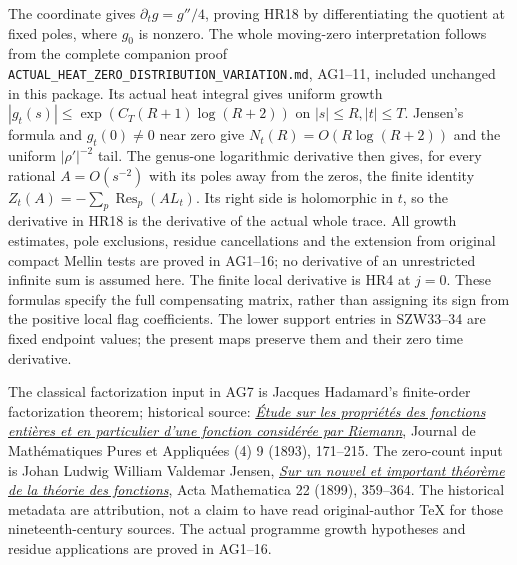 \documentclass[11pt,a4paper]{article}
\theoremstyle{definition}\newtheorem{definition}[theorem]{Definition}
\begin{document}
The coordinate gives $\partial_tg=g''/4$, proving HR18 by
differentiating the quotient at fixed poles, where $g_0$ is
nonzero. The whole moving-zero interpretation follows from the
complete companion proof \texttt{ACTUAL\_HEAT\_ZERO\_DISTRIBUTION\_VARIATION.md},
AG1--11, included unchanged in this package. Its actual heat integral
gives uniform growth $|g_t(s)|\le\exp(C_T(R+1)\log(R+2))$
on $|s|\le R,|t|\le T$. Jensen's formula and $g_t(0)\ne0$
near zero give $N_t(R)=O(R\log(R+2))$ and the uniform
$|\rho'|^{-2}$ tail. The genus-one logarithmic derivative then
gives, for every rational $A=O(s^{-2})$ with its poles away from
the zeros, the finite identity
$Z_t(A)=-\sum_p\operatorname{Res}_p(A L_t)$.
Its right side is holomorphic in $t$, so the derivative in HR18
is the derivative of the actual whole trace. All growth estimates,
pole exclusions, residue cancellations and the extension from
original compact Mellin tests are proved in AG1--16; no derivative
of an unrestricted infinite sum is assumed here.
The finite local derivative is HR4 at $j=0$.
These formulas specify the full compensating matrix, rather than
assigning its sign from the positive local flag coefficients.
The lower support entries in SZW33--34 are fixed endpoint values;
the present maps preserve them and their zero time derivative.

The classical factorization input in AG7 is Jacques Hadamard's
finite-order factorization theorem; historical source:
\href{https://www.numdam.org/item/JMPA_1893_4_9__171_0/}{\emph{\'Etude
sur les propri\'et\'es des fonctions enti\`eres et en particulier
d'une fonction consid\'er\'ee par Riemann}}, Journal de
Math\'ematiques Pures et Appliqu\'ees (4) 9 (1893), 171--215.
The zero-count input is Johan Ludwig William Valdemar Jensen,
\href{https://doi.org/10.1007/BF02417878}{\emph{Sur un nouvel et
important th\'eor\`eme de la th\'eorie des fonctions}}, Acta
Mathematica 22 (1899), 359--364. The historical metadata are
attribution, not a claim to have read original-author TeX for
those nineteenth-century sources. The actual programme growth
hypotheses and residue applications are proved in AG1--16.
\end{document}
